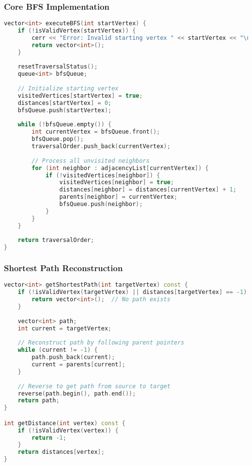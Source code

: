 \documentclass[12pt]{article}
\begin{document}
\subsubsection*{Core BFS Implementation}
\begin{lstlisting}[language=C++, basicstyle=\ttfamily\footnotesize, frame=single]
vector<int> executeBFS(int startVertex) {
    if (!isValidVertex(startVertex)) {
        cerr << "Error: Invalid starting vertex " << startVertex << "\n";
        return vector<int>();
    }
    
    resetTraversalStatus();
    queue<int> bfsQueue;
    
    // Initialize starting vertex
    visitedVertices[startVertex] = true;
    distances[startVertex] = 0;
    bfsQueue.push(startVertex);
    
    while (!bfsQueue.empty()) {
        int currentVertex = bfsQueue.front();
        bfsQueue.pop();
        traversalOrder.push_back(currentVertex);
        
        // Process all unvisited neighbors
        for (int neighbor : adjacencyList[currentVertex]) {
            if (!visitedVertices[neighbor]) {
                visitedVertices[neighbor] = true;
                distances[neighbor] = distances[currentVertex] + 1;
                parents[neighbor] = currentVertex;
                bfsQueue.push(neighbor);
            }
        }
    }
    
    return traversalOrder;
}
\end{lstlisting}

\subsubsection*{Shortest Path Reconstruction}
\begin{lstlisting}[language=C++, basicstyle=\ttfamily\footnotesize, frame=single]
vector<int> getShortestPath(int targetVertex) const {
    if (!isValidVertex(targetVertex) || distances[targetVertex] == -1) {
        return vector<int>();  // No path exists
    }
    
    vector<int> path;
    int current = targetVertex;
    
    // Reconstruct path by following parent pointers
    while (current != -1) {
        path.push_back(current);
        current = parents[current];
    }
    
    // Reverse to get path from source to target
    reverse(path.begin(), path.end());
    return path;
}

int getDistance(int vertex) const {
    if (!isValidVertex(vertex)) {
        return -1;
    }
    return distances[vertex];
}
\end{lstlisting}
\end{document}
